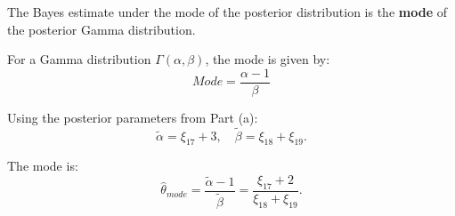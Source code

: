 The Bayes estimate under the mode of the posterior distribution is the \textbf{mode} of the posterior Gamma distribution. 

For a Gamma distribution $ \Gamma(\alpha, \beta) $, the mode is given by:
\begin{equation}
Mode = \frac{\alpha - 1}{\beta}
\end{equation}

Using the posterior parameters from Part (a):
\begin{equation}
\tilde{\alpha} = \xi_{17} + 3, \quad \tilde{\beta} = \xi_{18} + \xi_{19}.
\end{equation}

The mode is:
\begin{equation}
\hat{\theta}_{mode} = \frac{\tilde{\alpha} - 1}{\tilde{\beta}} = \frac{\xi_{17} + 2}{\xi_{18} + \xi_{19}}.
\end{equation}

